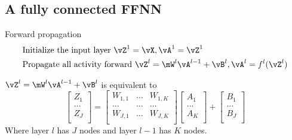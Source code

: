 \newcommand{\cA}{\mathcal{A}} \newcommand{\cB}{\mathcal{B}} \newcommand{\cC}{\mathcal{C}} \newcommand{\cD}{\mathcal{D}} \newcommand{\cE}{\mathcal{E}} \newcommand{\cF}{\mathcal{F}} \newcommand{\cG}{\mathcal{G}} \newcommand{\cH}{\mathcal{H}} \newcommand{\cI}{\mathcal{I}} \newcommand{\cJ}{\mathcal{J}} \newcommand{\cK}{\mathcal{K}} \newcommand{\cL}{\mathcal{L}} \newcommand{\cM}{\mathcal{M}} \newcommand{\cN}{\mathcal{N}} \newcommand{\cO}{\mathcal{O}} \newcommand{\cP}{\mathcal{P}} \newcommand{\cQ}{\mathcal{Q}} \newcommand{\cR}{\mathcal{R}} \newcommand{\cS}{\mathcal{S}} \newcommand{\cT}{\mathcal{T}} \newcommand{\cU}{\mathcal{U}} \newcommand{\cV}{\mathcal{V}} \newcommand{\cW}{\mathcal{W}} \newcommand{\cX}{\mathcal{X}} \newcommand{\cY}{\mathcal{Y}} \newcommand{\cZ}{\mathcal{Z}}

\newcommand{\ewise}[2]{{#1 * #2}} %

\newcommand{\EE}{\mathrm{E}} %

\newcommand{\g}{\,\vert\,} %

\subsection {A fully connected FFNN} \label {sec: fcffnn}
Forward propagation
\begin {equation} \begin {split}
& \text {Initialize the input layer } \vZ^1 = \vX, \vA^1 = \vZ^1 \\
& \text {Propagate all activity forward } \vZ^l = \mW^l \vA^{l-1} + \vB^l, \vA^l = f^l(\vZ^l) \\
\end {split} \end {equation}

$\vZ^l = \mW^l \vA^{l-1} + \vB^l$ is equivalent to 
\begin{equation} \label {eq: nnwts}
\begin{bmatrix}
Z_1 \\
\ldots \\
Z_J \\
\end{bmatrix}
= 
\begin{bmatrix}
W_{1,1} & \ldots & W_{1,K} \\
\ldots & \ldots & \ldots \\
W_{J,1} & \ldots & W_{J,K} \\
\end{bmatrix}
\begin{bmatrix}
A_1 \\
\ldots \\
A_K \\
\end{bmatrix} 
+
\begin{bmatrix}
B_1 \\
\ldots \\
B_J \\
\end{bmatrix}
\end{equation}
Where layer $l$ has $J$ nodes and layer $l-1$ has $K$ nodes.

